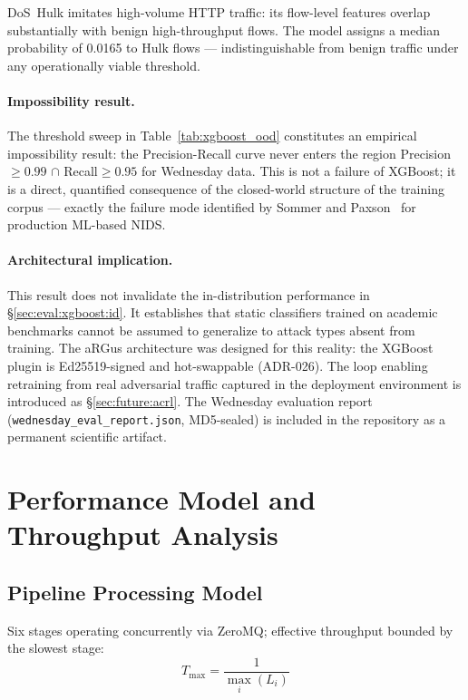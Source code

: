 \documentclass[11pt,a4paper]{article}
\begin{document}
    DoS~Hulk imitates high-volume HTTP traffic: its flow-level features overlap substantially
    with benign high-throughput flows. The model assigns a median probability of 0.0165 to
    Hulk flows --- indistinguishable from benign traffic under any operationally viable
    threshold.

    \paragraph{Impossibility result.}
    The threshold sweep in Table~\ref{tab:xgboost_ood} constitutes an empirical impossibility
    result: the Precision-Recall curve never enters the region
    Precision$\geq0.99$ $\cap$ Recall$\geq0.95$ for Wednesday data.
    This is not a failure of XGBoost; it is a direct, quantified consequence of the
    closed-world structure of the training corpus --- exactly the failure mode identified
    by Sommer and Paxson~\cite{sommer2010} for production ML-based NIDS.

    \paragraph{Architectural implication.}
    This result does not invalidate the in-distribution performance in
    \S\ref{sec:eval:xgboost:id}. It establishes that static classifiers trained on
    academic benchmarks cannot be assumed to generalize to attack types absent from
    training. The aRGus architecture was designed for this reality: the XGBoost plugin
    is Ed25519-signed and hot-swappable (ADR-026). The loop enabling retraining from
    real adversarial traffic captured in the deployment environment is introduced as
    \S\ref{sec:future:acrl}. The Wednesday evaluation report
    (\texttt{wednesday\_eval\_report.json}, MD5-sealed) is included in the repository
    as a permanent scientific artifact.

    \section{Performance Model and Throughput Analysis}

    \subsection{Pipeline Processing Model}

    Six stages operating concurrently via ZeroMQ; effective throughput bounded by the slowest
    stage:
    \begin{equation}
        T_{\max} = \frac{1}{\max_i(L_i)}
    \end{equation}
\end{document}
